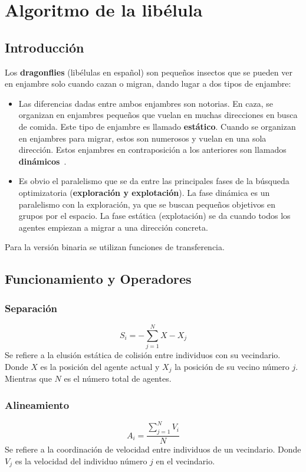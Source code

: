 \section{Algoritmo de la libélula}
\subsection{Introducción}
Los \textbf{dragonflies} (libélulas en español) son pequeños insectos que se pueden ver en enjambre solo cuando cazan o migran, dando lugar a dos tipos de enjambre:
\begin{itemize}
    \item Las diferencias dadas entre ambos enjambres son notorias. En caza, se organizan en enjambres pequeños que vuelan en muchas direcciones en busca de comida. Este tipo de enjambre es llamado \textbf{estático}. Cuando se organizan en enjambres para migrar, estos son numerosos y vuelan en una sola dirección. Estos enjambres en contraposición a los anteriores son llamados \textbf{dinámicos}~\cite{mirjalili_dragonfly_2016}.
    \item Es obvio el paralelismo que se da entre las principales fases de la búsqueda optimizatoria (\textbf{exploración y explotación}). La fase dinámica es un paralelismo con la exploración, ya que se buscan pequeños objetivos en grupos por el espacio. La fase estática (explotación) se da cuando todos los agentes empiezan a migrar a una dirección concreta.
\end{itemize}
Para la versión binaria se utilizan funciones de transferencia.

\subsection{Funcionamiento y Operadores}

\subsubsection{Separación}
\begin{equation}
    S_i = -\sum_{j=1}^N X - X_j
\end{equation}
Se refiere a la elusión estática de colisión entre individuos con su vecindario. Donde $X$ es la posición del agente actual y $X_j$ la posición de su vecino número $j$. Mientras que $N$ es el número total de agentes.

\subsubsection{Alineamiento}
\begin{equation}
    A_i = \frac{\sum_{j=1}^N V_i}{N}
\end{equation}
Se refiere a la coordinación de velocidad entre individuos de un vecindario. Donde $V_j$ es la velocidad del individuo número $j$ en el vecindario.

